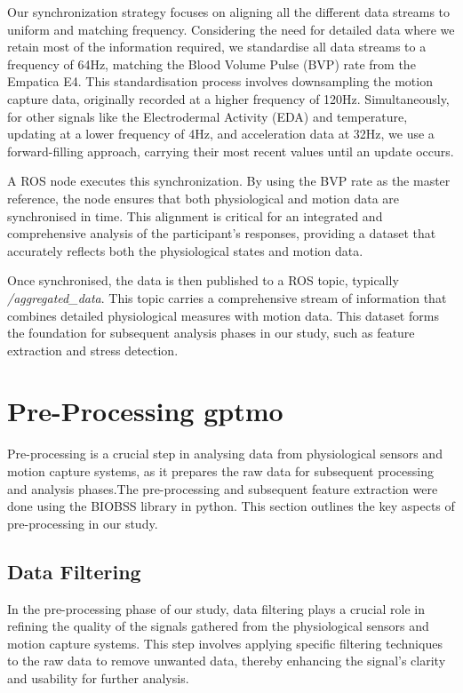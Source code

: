 Our synchronization strategy focuses on aligning all the different data streams to uniform and matching frequency. Considering the need for detailed data where we retain most of the information required, we standardise all data streams to a frequency of 64Hz, matching the Blood Volume Pulse (BVP) rate from the Empatica E4. This standardisation process involves downsampling the motion capture data, originally recorded at a higher frequency of 120Hz. Simultaneously, for other signals like the Electrodermal Activity (EDA) and temperature, updating at a lower frequency of 4Hz, and acceleration data at 32Hz, we use a forward-filling approach, carrying their most recent values until an update occurs.

A ROS node executes this synchronization. By using the BVP rate as the master reference, the node ensures that both physiological and motion data are synchronised in time. This alignment is critical for an integrated and comprehensive analysis of the participant's responses, providing a dataset that accurately reflects both the physiological states and motion data.

Once synchronised, the data is then published to a ROS topic, typically \textit{/aggregated\_data}. This topic carries a comprehensive stream of information that combines detailed physiological measures with motion data. This dataset forms the foundation for subsequent analysis phases in our study, such as feature extraction and stress detection.

\section{Pre-Processing \gls*{gptmo}} 
Pre-processing is a crucial step in analysing data from physiological sensors and motion capture systems, as it prepares the raw data for subsequent processing and analysis phases.The pre-processing and subsequent feature extraction were done using the BIOBSS library in python\parencite{biobss}. This section outlines the key aspects of pre-processing in our study.

\subsection*{Data Filtering} \label{sec:data_filtering}

In the pre-processing phase of our study, data filtering plays a crucial role in refining the quality of the signals gathered from the physiological sensors and motion capture systems. This step involves applying specific filtering techniques to the raw data to remove unwanted data, thereby enhancing the signal's clarity and usability for further analysis.

